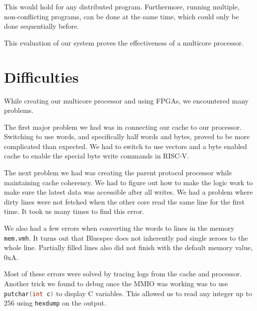 \documentclass{article}
\begin{document}
This would hold for any distributed program. Furthermore, running multiple, non-conflicting programs, can be done at the same time, which could only be done sequentially before.

This evaluation of our system proves the effectiveness of a multicore processor.


\section{Difficulties}
 
While creating our multicore processor and using FPGAs, we encountered many problems. 

The first major problem we had was in connecting our cache to our processor. Switching to use words, and specifically half words and bytes, proved to be more complicated than expected. We had to switch to use vectors and a byte enabled cache to enable the special byte write commands in RISC-V.

The next problem we had was creating the parent protocol processor while maintaining cache coherency. We had to figure out how to make the logic work to make sure the latest data was accessible after all writes. We had a problem where dirty lines were not fetched when the other core read the same line for the first time. It took us many times to find this error.

We also had a few errors when converting the words to lines in the memory \lstinline{mem.vmh}. It turns out that Bluespec does not inherently pad single zeroes to the whole line. Partially filled lines also did not finish with the default memory value, 0xA. 

Most of these errors were solved by tracing logs from the cache and processor. Another trick we found to debug once the MMIO was working was to use \lstinline[language=C]|putchar(int c)| to display C variables. This allowed us to read any integer up to 256 using \lstinline|hexdump| on the output. 
\end{document}
